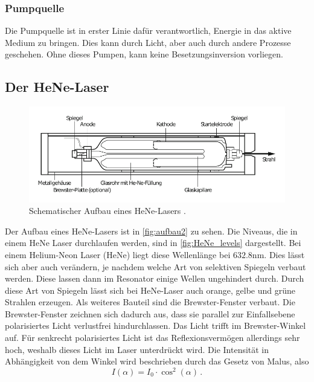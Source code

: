 \subsubsection*{Pumpquelle}
Die Pumpquelle ist in erster Linie dafür verantwortlich, Energie in das aktive Medium zu bringen.
Dies kann durch Licht, aber auch durch andere Prozesse geschehen.
Ohne dieses Pumpen, kann keine Besetzungsinversion vorliegen.

\subsection{Der HeNe-Laser}
\begin{figure}
    \centering
    \includegraphics[width = 0.7 \linewidth]{pictures/aufbau2.pdf}
    \caption{Schematischer Aufbau eines HeNe-Lasers \cite{HeNe_levels}.}
    \label{fig:aufbau2}
\end{figure}
Der Aufbau eines HeNe-Lasers ist in \autoref{fig:aufbau2} zu sehen.
Die Niveaus, die in einem HeNe Laser durchlaufen werden, sind in \autoref{fig:HeNe_levels} dargestellt.
Bei einem Helium-Neon Laser (HeNe) liegt diese Wellenlänge bei $632.8 \unit{\nano\meter}$.
Dies lässt sich aber auch verändern, je nachdem welche Art von selektiven Spiegeln verbaut werden.
Diese lassen dann im Resonator einige Wellen ungehindert durch.
Durch diese Art von Spiegeln lässt sich bei HeNe-Laser auch orange, gelbe und grüne Strahlen erzeugen. 
Als weiteres Bauteil sind die Brewster-Fenster verbaut.
Die Brewster-Fenster zeichnen sich dadurch aus, dass sie parallel zur Einfallsebene polarisiertes Licht verlustfrei hindurchlassen.
Das Licht trifft im Brewster-Winkel auf.
Für senkrecht polarisiertes Licht ist das Reflexionsvermögen allerdings sehr hoch, weshalb dieses Licht im Laser unterdrückt wird.
Die Intensität in Abhängigkeit von dem Winkel wird beschrieben durch das Gesetz von Malus, also
\begin{equation} \label{eq:malus}
    I(\alpha) = I_0 \cdot \cos^2(\alpha) \, .
\end{equation}